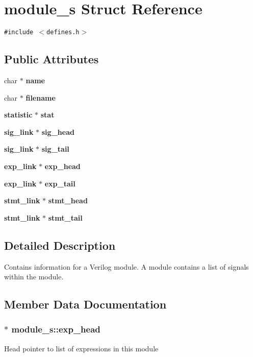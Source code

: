 \section{module\_\-s  Struct Reference}
\label{structmodule__s}
{\tt \#include $<$defines.h$>$}

\subsection*{Public Attributes}
\begin{CompactItemize}
\item 
char $\ast$ {\bf name}
\item 
char $\ast$ {\bf filename}
\item 
{\bf statistic} $\ast$ {\bf stat}
\item 
{\bf sig\_\-link} $\ast$ {\bf sig\_\-head}
\item 
{\bf sig\_\-link} $\ast$ {\bf sig\_\-tail}
\item 
{\bf exp\_\-link} $\ast$ {\bf exp\_\-head}
\item 
{\bf exp\_\-link} $\ast$ {\bf exp\_\-tail}
\item 
{\bf stmt\_\-link} $\ast$ {\bf stmt\_\-head}
\item 
{\bf stmt\_\-link} $\ast$ {\bf stmt\_\-tail}
\end{CompactItemize}


\subsection{Detailed Description}
Contains information for a Verilog module. A module contains a list of signals within the module. 



\subsection{Member Data Documentation}
\subsubsection{$\ast$ module\_\-s::exp\_\-head}\label{structmodule__s_m5}


Head pointer to list of expressions in this module 
